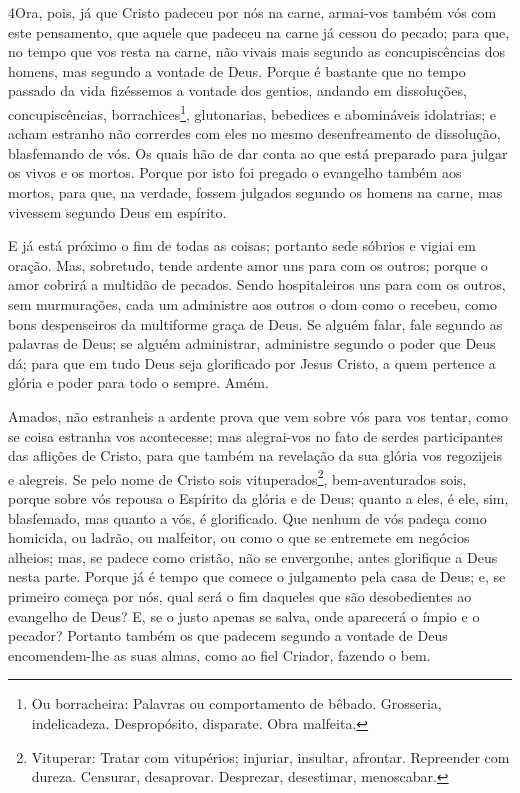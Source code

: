 \medskip

\lettrine{4} Ora, pois, já que Cristo padeceu por nós na
carne, armai-vos também vós com este pensamento, que aquele que
padeceu na carne já cessou do pecado; para que, no tempo que vos
resta na carne, não vivais mais segundo as concupiscências dos
homens, mas segundo a vontade de Deus. Porque é bastante que no
tempo passado da vida fizéssemos a vontade dos gentios, andando em
dissoluções, concupiscências, borrachices\footnote{Ou borracheira:
Palavras ou comportamento de bêbado. Grosseria, indelicadeza.
Despropósito, disparate. Obra malfeita.}, glutonarias, bebedices e
abomináveis idolatrias; e acham estranho não correrdes com eles
no mesmo desenfreamento de dissolução, blasfemando de vós. Os
quais hão de dar conta ao que está preparado para julgar os vivos e
os mortos. Porque por isto foi pregado o evangelho também aos
mortos, para que, na verdade, fossem julgados segundo os homens na
carne, mas vivessem segundo Deus em espírito.

E já está próximo o fim de todas as coisas; portanto sede sóbrios
e vigiai em oração. Mas, sobretudo, tende ardente amor uns para
com os outros; porque o amor cobrirá a multidão de pecados.
Sendo hospitaleiros uns para com os outros, sem murmurações,
cada um administre aos outros o dom como o recebeu, como bons
despenseiros da multiforme graça de Deus. Se alguém falar,
fale segundo as palavras de Deus; se alguém administrar, administre
segundo o poder que Deus dá; para que em tudo Deus seja glorificado
por Jesus Cristo, a quem pertence a glória e poder para todo o
sempre. Amém.

Amados, não estranheis a ardente prova que vem sobre vós para vos
tentar, como se coisa estranha vos acontecesse; mas
alegrai-vos no fato de serdes participantes das aflições de Cristo,
para que também na revelação da sua glória vos regozijeis e
alegreis. Se pelo nome de Cristo sois
vituperados\footnote{Vituperar: Tratar com vitupérios; injuriar,
insultar, afrontar. Repreender com dureza. Censurar, desaprovar.
Desprezar, desestimar, menoscabar.}, bem-aventurados sois, porque
sobre vós repousa o Espírito da glória e de Deus; quanto a eles, é
ele, sim, blasfemado, mas quanto a vós, é glorificado. Que
nenhum de vós padeça como homicida, ou ladrão, ou malfeitor, ou como
o que se entremete em negócios alheios; mas, se padece como
cristão, não se envergonhe, antes glorifique a Deus nesta parte.
Porque já é tempo que comece o julgamento pela casa de Deus;
e, se primeiro começa por nós, qual será o fim daqueles que são
desobedientes ao evangelho de Deus? E, se o justo apenas se
salva, onde aparecerá o ímpio e o pecador? Portanto também os
que padecem segundo a vontade de Deus encomendem-lhe as suas almas,
como ao fiel Criador, fazendo o bem.

